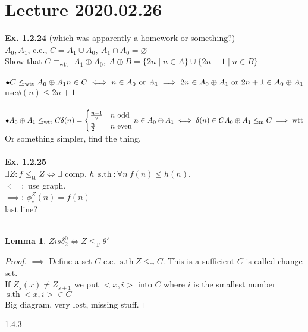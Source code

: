 \documentclass{article}
\newcommand{\sth}{\ \mathrm{s.th}\ }
\newcommand{\tr}{\leq_\mathrm{T}}
\newcommand{\mor}{\leq_\mathrm{m}}
\renewcommand{\emptyset}{\varnothing}
\newtheorem{lemma}[theorem]{Lemma}
\theoremstyle{definition}
\theoremstyle{remark}
\theoremstyle{example}
\begin{document}
	\section*{Lecture 2020.02.26}
	\textbf{Ex. 1.2.24} (which was apparently a homework or something?)\\
	$A_0, A_1$, c.e., $C=A_1 \cup A_0,\ A_1 \cap A_0 = \emptyset$\\
	Show that $C\equiv_\mathrm{wtt}$ $A_1 \oplus A_0,\ A \oplus B = \{2n \mid n \in A\} \cup \{2n+1 \mid n \in B\}$\\\\
	$\bullet C \leq_\mathrm{wtt} A_0 \oplus A_1\\
	n \in C \iff n \in A_0\ \mathrm{or}\ A_1 \implies 2n \in A_0 \oplus A_1\ \mathrm{or}\ 2n+1 \in A_0 \oplus A_1$\\
	use$\phi(n) \leq 2n+1$\\
	\\
	$\bullet A_0 \oplus A_1 \leq_{\mathrm{wtt}} C\\
	\delta(n) = \begin{cases}
		\frac{n-1}{2} & n\ \mathrm{odd}\\
		\frac{n}{2} & n\ \mathrm{even}
	\end{cases}\\
	n \in A_0 \oplus A_1 \iff \delta(n) \in C\\
	A_0 \oplus A_1 \mor C \implies \mathrm{wtt}$
	Or something simpler, find the thing.\\
	\\
	\textbf{Ex. 1.2.25}\\
	$\exists Z : f \leq_{\mathrm{tt}} Z \iff \exists$ comp. $h\ \sth : \forall n\ f(n) \leq h(n)$.\\
	$\impliedby:$ use graph.\\
	$\implies$: $\phi_e^Z(n)=f(n)$\\ last line?\\
	\\
	\begin{lemma}
		$Z is \delta_2^0 \iff Z \tr  \theta'$
	\end{lemma}
	\begin{proof}
		$\implies$ Define a set $C$ c.e. $\sth Z \tr C$. This is a sufficient $C$ is called change set.\\
		If $Z_s(x) \neq Z_{s+1}$ we put $<x,i>$ into $C$ where $i$ is the smallest number $\sth <x,i> \in C$\\
		Big diagram, very lost, missing stuff.
	\end{proof}
	1.4.3\\
\end{document}
